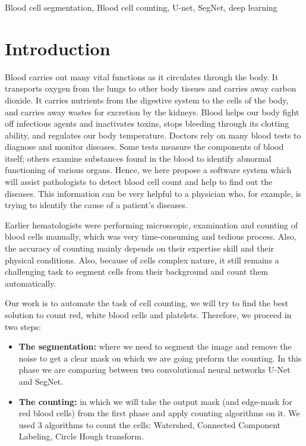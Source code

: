 \documentclass[conference]{IEEEtran}
\begin{document}
\begin{IEEEkeywords}
Blood cell segmentation, Blood cell counting, U-net, SegNet, deep learning 
\end{IEEEkeywords}

\section{Introduction}
Blood carries out many vital functions as it circulates through the body. It transports oxygen from the lungs to other body tissues and carries away carbon dioxide. It carries nutrients from the digestive system to the cells of the body, and carries away wastes for excretion by the kidneys. Blood helps our body fight off infectious agents and inactivates toxins, stops bleeding through its clotting ability, and regulates our body temperature. Doctors rely on many blood tests to diagnose and monitor diseases. Some tests measure the components of blood itself; others examine substances found in the blood to identify abnormal functioning of various organs. Hence, we here propose a software system which will assist pathologists to detect blood cell count and help to find out the diseases. This information can be very helpful to a physician who, for example, is trying to identify the cause of a patient's diseases.

Earlier hematologists were performing microscopic, examination and counting of blood cells manually, which was very time-consuming and tedious process. Also, the accuracy of counting mainly depends on their expertise skill and their physical conditions. Also, because of cells complex nature, it still remains a challenging task to segment cells from their background and count them automatically.

Our work is to automate the task of cell counting, we will try to find the best solution to count red, white blood cells and platelets. Therefore, we proceed in two steps:
\begin{itemize}
    \item \textbf{The segmentation:} where we need to segment the image and remove the noise to get a clear mask on which we are going preform the counting. In this phase we are comparing between two convolutional neural networks U-Net and SegNet.
    \item \textbf{The counting:} in which we will take the output mask (and edge-mask for red blood cells) from the first phase and apply counting algorithms on it. We used 3 algorithms to count the cells: Watershed, Connected Component Labeling, Circle Hough transform.\
\end{itemize}
\end{document}
